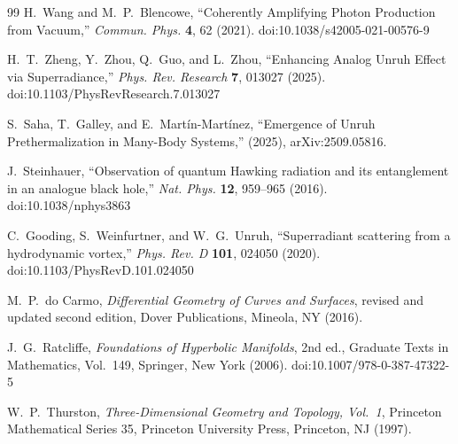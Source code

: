 \documentclass[10pt,reprint,aps,onecolumn,nofootinbib]{revtex4-2}
\begin{document}
\begin{thebibliography}{99}
                H.~Wang and M.~P.~Blencowe,
                ``Coherently Amplifying Photon Production from Vacuum,''
                \textit{Commun. Phys.} \textbf{4}, 62 (2021).
                doi:10.1038/s42005-021-00576-9



                H.~T.~Zheng, Y.~Zhou, Q.~Guo, and L.~Zhou,
                ``Enhancing Analog Unruh Effect via Superradiance,''
                \textit{Phys. Rev. Research} \textbf{7}, 013027 (2025).
                doi:10.1103/PhysRevResearch.7.013027

                S.~Saha, T.~Galley, and E.~Mart\'in-Mart\'inez,
                ``Emergence of Unruh Prethermalization in Many-Body Systems,''
                (2025), arXiv:2509.05816.

                J.~Steinhauer,
                ``Observation of quantum Hawking radiation and its entanglement in an analogue black hole,''
                \textit{Nat. Phys.} \textbf{12}, 959--965 (2016).
                doi:10.1038/nphys3863

                C.~Gooding, S.~Weinfurtner, and W.~G.~Unruh,
                ``Superradiant scattering from a hydrodynamic vortex,''
                \textit{Phys. Rev. D} \textbf{101}, 024050 (2020).
                doi:10.1103/PhysRevD.101.024050

                M.~P.~do Carmo,
                \textit{Differential Geometry of Curves and Surfaces},
                revised and updated second edition,
                Dover Publications, Mineola, NY (2016).

                J.~G.~Ratcliffe,
                \textit{Foundations of Hyperbolic Manifolds}, 2nd ed.,
                Graduate Texts in Mathematics, Vol.~149,
                Springer, New York (2006).
                doi:10.1007/978-0-387-47322-5

                W.~P.~Thurston,
                \textit{Three-Dimensional Geometry and Topology, Vol.~1},
                Princeton Mathematical Series 35,
                Princeton University Press, Princeton, NJ (1997).
            \end{thebibliography}
\end{document}
